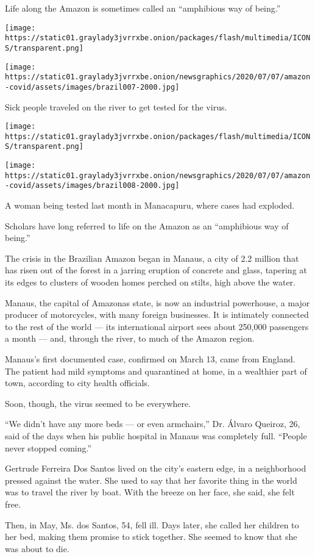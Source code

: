 Life along the Amazon is sometimes called an ``amphibious way of
being.''

\texttt{[image: https://static01.graylady3jvrrxbe.onion/packages/flash/multimedia/ICONS/transparent.png]}

\texttt{[image: https://static01.graylady3jvrrxbe.onion/newsgraphics/2020/07/07/amazon-covid/assets/images/brazil007-2000.jpg]}

Sick people traveled on the river to get tested for the virus.

\texttt{[image: https://static01.graylady3jvrrxbe.onion/packages/flash/multimedia/ICONS/transparent.png]}

\texttt{[image: https://static01.graylady3jvrrxbe.onion/newsgraphics/2020/07/07/amazon-covid/assets/images/brazil008-2000.jpg]}

A woman being tested last month in Manacapuru, where cases had exploded.

Scholars have long referred to life on the Amazon as an ``amphibious way
of being.''

The crisis in the Brazilian Amazon began in Manaus, a city of 2.2
million that has risen out of the forest in a jarring eruption of
concrete and glass, tapering at its edges to clusters of wooden homes
perched on stilts, high above the water.

Manaus, the capital of Amazonas state, is now an industrial powerhouse,
a major producer of motorcycles, with many foreign businesses. It is
intimately connected to the rest of the world --- its international
airport sees about 250,000 passengers a month --- and, through the
river, to much of the Amazon region.

Manaus's first documented case, confirmed on March 13, came from
England. The patient had mild symptoms and quarantined at home, in a
wealthier part of town, according to city health officials.

Soon, though, the virus seemed to be everywhere.

``We didn't have any more beds --- or even armchairs,'' Dr. Álvaro
Queiroz, 26, said of the days when his public hospital in Manaus was
completely full. ``People never stopped coming.''

Gertrude Ferreira Dos Santos lived on the city's eastern edge, in a
neighborhood pressed against the water. She used to say that her
favorite thing in the world was to travel the river by boat. With the
breeze on her face, she said, she felt free.

Then, in May, Ms. dos Santos, 54, fell ill. Days later, she called her
children to her bed, making them promise to stick together. She seemed
to know that she was about to die.

